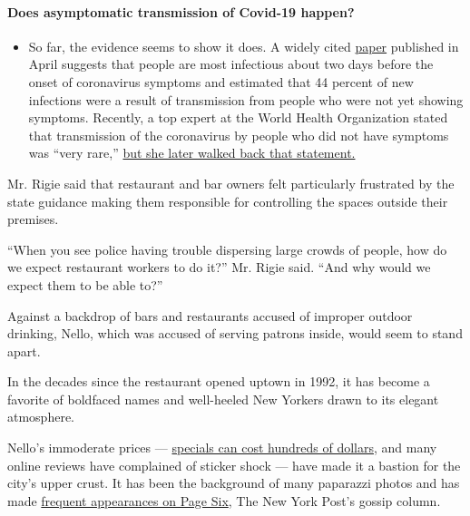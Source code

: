\begin{itemize}
{  \paragraph{Does asymptomatic transmission of Covid-19
  happen?}\label{does-asymptomatic-transmission-of-covid-19-happen}}

  \begin{itemize}
  \tightlist
  \item
    So far, the evidence seems to show it does. A widely cited
    \href{https://www.nature.com/articles/s41591-020-0869-5}{paper}
    published in April suggests that people are most infectious about
    two days before the onset of coronavirus symptoms and estimated that
    44 percent of new infections were a result of transmission from
    people who were not yet showing symptoms. Recently, a top expert at
    the World Health Organization stated that transmission of the
    coronavirus by people who did not have symptoms was ``very rare,''
    \href{https://www.nytimes.com/2020/06/09/world/coronavirus-updates.html?action=click\&pgtype=Article\&state=default\&region=MAIN_CONTENT_3\&context=storylines_faq\#link-1f302e21}{but
    she later walked back that statement.}
  \end{itemize}
\end{itemize}

Mr. Rigie said that restaurant and bar owners felt particularly
frustrated by the state guidance making them responsible for controlling
the spaces outside their premises.

``When you see police having trouble dispersing large crowds of people,
how do we expect restaurant workers to do it?'' Mr. Rigie said. ``And
why would we expect them to be able to?''

Against a backdrop of bars and restaurants accused of improper outdoor
drinking, Nello, which was accused of serving patrons inside, would seem
to stand apart.

In the decades since the restaurant opened uptown in 1992, it has become
a favorite of boldfaced names and well-heeled New Yorkers drawn to its
elegant atmosphere.

Nello's immoderate prices ---
\href{https://www.nytimes.com/2012/01/08/your-money/at-nello-a-case-of-restaurant-bill-shock-the-haggler.html}{specials
can cost hundreds of dollars}, and many online reviews have complained
of sticker shock --- have made it a bastion for the city's upper crust.
It has been the background of many paparazzi photos and has made
\href{https://www.nytimes.com/2007/05/27/fashion/27nello.html}{frequent
appearances on Page Six}, The New York Post's gossip column.


